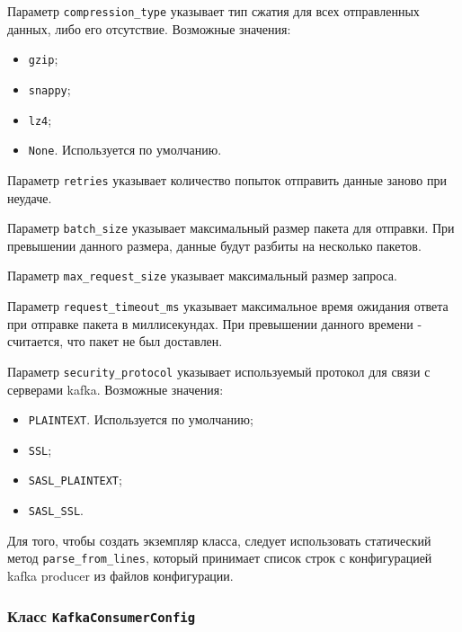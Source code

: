 Параметр \texttt{compression\_type} указывает тип сжатия для всех отправленных данных, либо его отсутствие.
Возможные значения:
\begin{itemize}
    \item \texttt{gzip};
    \item \texttt{snappy};
    \item \texttt{lz4};
    \item \texttt{None}. Используется по умолчанию.
\end{itemize}

Параметр \texttt{retries} указывает количество попыток отправить данные заново при неудаче.

Параметр \texttt{batch\_size} указывает максимальный размер пакета для отправки.
При превышении данного размера, данные будут разбиты на несколько пакетов.

Параметр \texttt{max\_request\_size} указывает максимальный размер запроса.

Параметр \texttt{request\_timeout\_ms} указывает максимальное время ожидания ответа при отправке пакета в миллисекундах.
При превышении данного времени - считается, что пакет не был доставлен.

Параметр \texttt{security\_protocol} указывает используемый протокол для связи с серверами kafka.
Возможные значения:
\begin{itemize}
    \item \texttt{PLAINTEXT}. Используется по умолчанию;
    \item \texttt{SSL};
    \item \texttt{SASL\_PLAINTEXT};
    \item \texttt{SASL\_SSL}.
\end{itemize}

Для того, чтобы создать экземпляр класса, следует использовать статический метод \texttt{parse\_from\_lines}, который принимает список строк с конфигурацией kafka producer из файлов конфигурации.


\subsubsection{Класс \texttt{KafkaConsumerConfig}}


